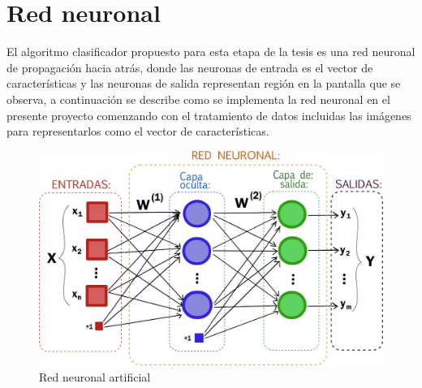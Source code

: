 \section{Red neuronal}
    El algoritmo clasificador propuesto para esta etapa de la tesis es una red neuronal de propagación hacia atrás, donde las neuronas de entrada es el vector de características y las neuronas de salida representan región en la pantalla que se observa, a continuación se describe como se implementa la red neuronal en el presente proyecto comenzando con el tratamiento de datos incluidas las imágenes para representarlos como el vector de características.
	\begin{figure}[htbp]
		\centering
		\includegraphics[width=.5\textwidth]{./pictures/neuralNet}
		\caption{Red neuronal artificial}\label{fig: figura}
	\end{figure}
	
